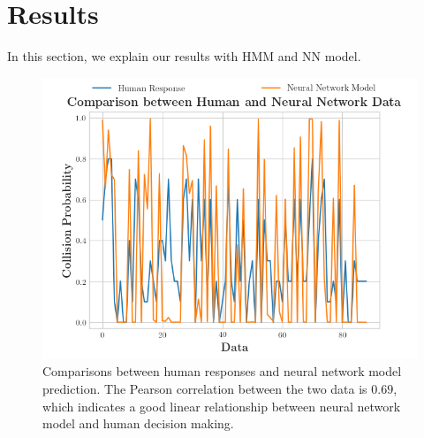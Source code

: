 
\section{Results} \label{sec:results}
In this section, we explain our results with HMM and NN model.

\begin{figure}[t]
  \centering
  \includegraphics[width=\linewidth]{figures/nn_result.png}
  \caption{Comparisons between human responses and neural network model prediction. The Pearson correlation between the two data is $0.69$, which indicates a good linear relationship between neural network model and human decision making.}
  \label{fig:nn_raw_result}
\end{figure}

